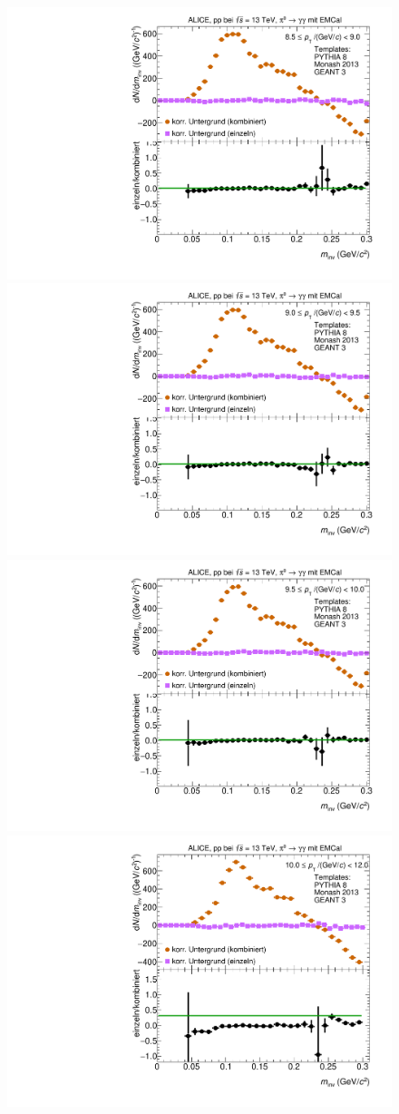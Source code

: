 \begin{figure}[t]
\begin{multicols}{2}
\end{multicols}
\begin{multicols}{2}
    \includegraphics[width=.65\linewidth]{Anhang/BackgroundWithRatio32_Data_2016.pdf}\par
    \includegraphics[width=.65\linewidth]{Anhang/BackgroundWithRatio33_Data_2016.pdf}\par
\end{multicols}
\begin{multicols}{2}
    \includegraphics[width=.65\linewidth]{Anhang/BackgroundWithRatio34_Data_2016.pdf}\par
    \includegraphics[width=.65\linewidth]{Anhang/BackgroundWithRatio35_Data_2016.pdf}\par

\end{multicols}
\end{figure}
